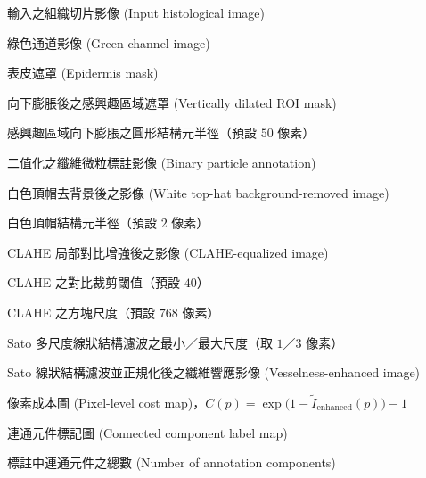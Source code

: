 
\begin{denotation}[3cm]

\item[$I$]{
  輸入之組織切片影像 (Input histological image)
}

\item[$I_{g}$]{
  綠色通道影像 (Green channel image)
}

\item[$M$]{
  表皮遮罩 (Epidermis mask)
}

\item[$M_{\text{ROI}}$]{
  向下膨脹後之感興趣區域遮罩 (Vertically dilated ROI mask)
}

\item[$\text{offset}$]{
  感興趣區域向下膨脹之圓形結構元半徑（預設 $50$ 像素）
}

\item[$P$]{
  二值化之纖維微粒標註影像 (Binary particle annotation)
}

\item[$I_{\text{th}}$]{
  白色頂帽去背景後之影像 (White top-hat background-removed image)
}

\item[$r_{\text{bg}}$]{
  白色頂帽結構元半徑（預設 $2$ 像素）
}

\item[$I_{\text{eq}}$]{
  CLAHE 局部對比增強後之影像 (CLAHE-equalized image)
}

\item[$\beta$]{
  CLAHE 之對比裁剪閾值（預設 $40$）
}

\item[$n_{\text{tile}}$]{
  CLAHE 之方塊尺度（預設 $768$ 像素）
}

\item[$\sigma_{\min},\,\sigma_{\max}$]{
  Sato 多尺度線狀結構濾波之最小／最大尺度（取 $1$／$3$ 像素）
}

\item[$I_{\text{enhanced}}$]{
  Sato 線狀結構濾波並正規化後之纖維響應影像 (Vesselness-enhanced image)
}

\item[$C$]{
  像素成本圖 (Pixel-level cost map)，$C(p) = \exp\!\bigl(1 - \tilde{I}_{\text{enhanced}}(p)\bigr) - 1$
}

\item[$L$]{
  連通元件標記圖 (Connected component label map)
}

\item[$N$]{
  標註中連通元件之總數 (Number of annotation components)
}


\end{denotation}
